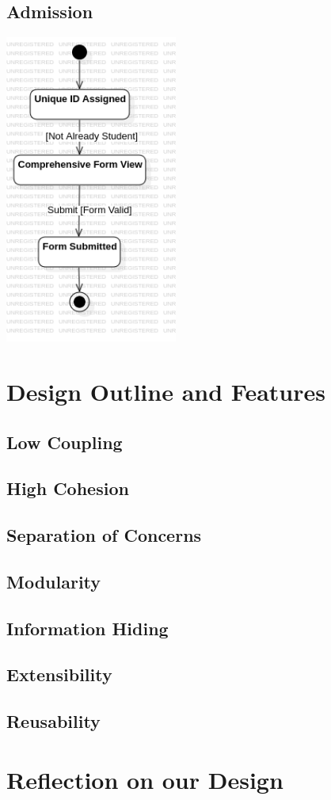 \documentclass[11pt]{article}
\begin{document}
\subsection{Admission}
\begin{center}
\includegraphics[height=4in]{state_diagrams/StateMachine6!Admission_5.png}
\end{center}



\section{Design Outline and Features}

\subsection{Low Coupling}
\subsection{High Cohesion}
\subsection{Separation of Concerns}
\subsection{Modularity}
\subsection{Information Hiding}
\subsection{Extensibility}
\subsection{Reusability}

\section{Reflection on our Design}
\end{document}
